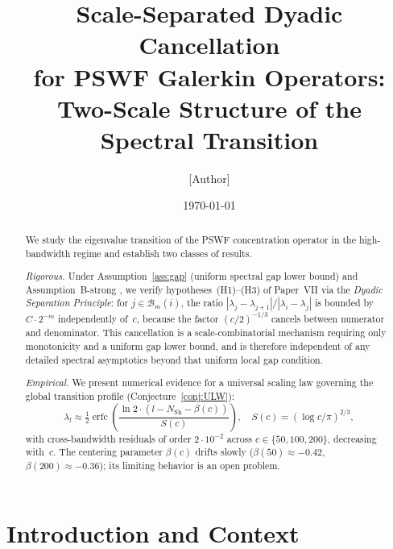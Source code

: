 \documentclass[12pt]{amsart}
\theoremstyle{definition}
\theoremstyle{remark}
\newcommand{\NSh}{N_{\mathrm{Sh}}}
\begin{document}

\title[Scale-Separated Dyadic Cancellation]
      {Scale-Separated Dyadic Cancellation\\
       for PSWF Galerkin Operators:\\
       Two-Scale Structure of the Spectral Transition}

\author{[Author]}
\date{\today}
\maketitle

\begin{abstract}
We study the eigenvalue transition of the PSWF concentration
operator in the high-bandwidth regime and establish two
classes of results.

\emph{Rigorous.}
Under Assumption~\ref{ass:gap} (uniform spectral gap
lower bound) and Assumption~B-strong \cite{paperVI},
we verify hypotheses~(H1)--(H3) of Paper~VII \cite{paperVII}
via the \emph{Dyadic Separation Principle}:
for $j \in \mathcal{B}_m(i)$, the ratio
$|\lambda_j - \lambda_{j+1}|/|\lambda_i - \lambda_j|$
is bounded by $C \cdot 2^{-m}$ independently of~$c$,
because the factor $(c/2)^{-1/3}$ cancels between
numerator and denominator.
This cancellation is a scale-combinatorial mechanism
requiring only monotonicity and a uniform gap lower
bound, and is therefore independent of any detailed
spectral asymptotics beyond that uniform local gap
condition.

\emph{Empirical.}
We present numerical evidence for a universal scaling law
governing the global transition profile
(Conjecture~\ref{conj:ULW}):
\[
  \lambda_l \approx \tfrac{1}{2}\operatorname{erfc}
  \!\left(\frac{\ln 2\cdot(l-\NSh-\beta(c))}{S(c)}\right),
  \quad S(c) = (\log c/\pi)^{2/3},
\]
with cross-bandwidth residuals of order $2\cdot 10^{-2}$
across $c \in \{50,100,200\}$, decreasing with~$c$.
The centering parameter $\beta(c)$ drifts slowly
($\beta(50)\approx -0.42$, $\beta(200)\approx -0.36$);
its limiting behavior is an open problem.
\end{abstract}

\section{Introduction and Context}
\label{sec:intro}
\end{document}
